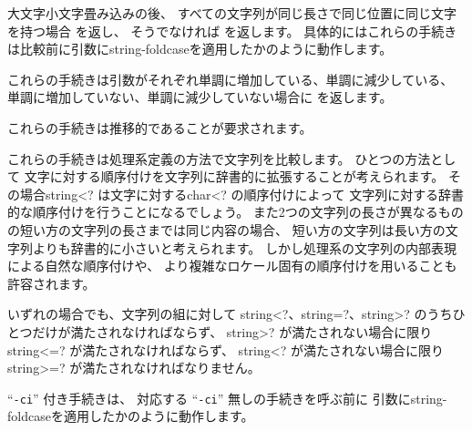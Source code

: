 \begin{entry}{%
}

大文字小文字畳み込みの後、
すべての文字列が同じ長さで同じ位置に同じ文字を持つ場合 \schtrue{}を返し、
そうでなければ \schfalse{}を返します。
具体的にはこれらの手続きは比較前に引数に{\cf string-foldcase}を適用したかのように動作します。

\end{entry}


\begin{entry}{%
}

これらの手続きは引数がそれぞれ単調に増加している、単調に減少している、
単調に増加していない、単調に減少していない場合に \schtrue{}を返します。

これらの手続きは推移的であることが要求されます。

これらの手続きは処理系定義の方法で文字列を比較します。
ひとつの方法として
文字に対する順序付けを文字列に辞書的に拡張することが考えられます。
その場合{\cf string<?} は文字に対する{\cf char<?} の順序付けによって
文字列に対する辞書的な順序付けを行うことになるでしょう。
また2つの文字列の長さが異なるものの短い方の文字列の長さまでは同じ内容の場合、
短い方の文字列は長い方の文字列よりも辞書的に小さいと考えられます。
しかし処理系の文字列の内部表現による自然な順序付けや、
より複雑なロケール固有の順序付けを用いることも許容されます。

いずれの場合でも、文字列の組に対して
{\cf string<?}、{\cf string=?}、{\cf string>?} 
のうちひとつだけが満たされなければならず、
{\cf string>?} が満たされない場合に限り{\cf string<=?} が満たされなければならず、
{\cf string<?} が満たされない場合に限り{\cf string>=?} が満たされなければなりません。

``{\tt -ci}'' 付き手続きは、
対応する ``{\tt -ci}'' 無しの手続きを呼ぶ前に
引数に{\cf string-foldcase}を適用したかのように動作します。


\end{entry}


